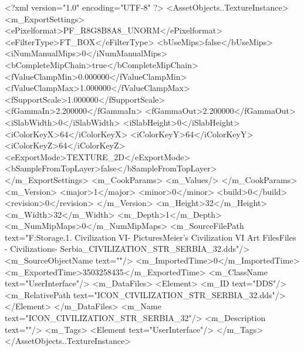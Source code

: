 <?xml version="1.0" encoding="UTF-8" ?>
<AssetObjects..TextureInstance>
	<m_ExportSettings>
		<ePixelformat>PF_R8G8B8A8_UNORM</ePixelformat>
		<eFilterType>FT_BOX</eFilterType>
		<bUseMips>false</bUseMips>
		<iNumManualMips>0</iNumManualMips>
		<bCompleteMipChain>true</bCompleteMipChain>
		<fValueClampMin>0.000000</fValueClampMin>
		<fValueClampMax>1.000000</fValueClampMax>
		<fSupportScale>1.000000</fSupportScale>
		<fGammaIn>2.200000</fGammaIn>
		<fGammaOut>2.200000</fGammaOut>
		<iSlabWidth>0</iSlabWidth>
		<iSlabHeight>0</iSlabHeight>
		<iColorKeyX>64</iColorKeyX>
		<iColorKeyY>64</iColorKeyY>
		<iColorKeyZ>64</iColorKeyZ>
		<eExportMode>TEXTURE_2D</eExportMode>
		<bSampleFromTopLayer>false</bSampleFromTopLayer>
	</m_ExportSettings>
	<m_CookParams>
		<m_Values/>
	</m_CookParams>
	<m_Version>
		<major>1</major>
		<minor>0</minor>
		<build>0</build>
		<revision>0</revision>
	</m_Version>
	<m_Height>32</m_Height>
	<m_Width>32</m_Width>
	<m_Depth>1</m_Depth>
	<m_NumMipMaps>0</m_NumMipMaps>
	<m_SourceFilePath text="F:\Mod Storage\2.1. Civilization VI\Mods\Archive - Pictures\Sid Meier's Civilization VI Art Files\Art Files - Civilizations\Civilization - Serbia\ICON_CIVILIZATION_STR_SERBIA_32.dds"/>
	<m_SourceObjectName text=""/>
	<m_ImportedTime>0</m_ImportedTime>
	<m_ExportedTime>3503258435</m_ExportedTime>
	<m_ClassName text="UserInterface"/>
	<m_DataFiles>
		<Element>
			<m_ID text="DDS"/>
			<m_RelativePath text="ICON_CIVILIZATION_STR_SERBIA_32.dds"/>
		</Element>
	</m_DataFiles>
	<m_Name text="ICON_CIVILIZATION_STR_SERBIA_32"/>
	<m_Description text=""/>
	<m_Tags>
		<Element text="UserInterface"/>
	</m_Tags>
</AssetObjects..TextureInstance>

